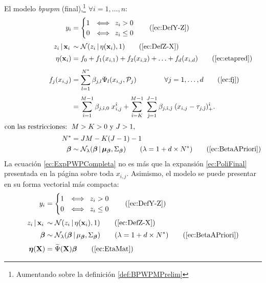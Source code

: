 \documentclass[../Main/Main.tex]{subfiles}
\begin{document}
\begin{definition} \label{def:BPWPMFinal}
El modelo \textit{bpwpm} (final),\footnote{Aumentando sobre la definición \ref{def:BPWPMPrelim}} $\forall i = 1,\ldots,n$: 
\begin{align}
y_i &= 
	\begin{cases}
		1 & \Longleftrightarrow \enspace z_i > 0 \\
		0 & \Longleftrightarrow \enspace z_i \leq 0
	\end{cases} \tag{\ref{ec:DefY-Z}} \\[2pt]
z_i \,|\, \xni\, &\sim \mathcal{N}(z_i\,|\,\eta(\xni),1) 
	\tag{\ref{ec:DefZ-X}} \\[2pt]
\eta(\xni) &= f_0 + f_1(x_{i,1}) + f_2(x_{i,2}) + \ldots + f_d(x_{i,d})
	\tag{\ref{ec:etapred}} \\[4pt]
f_j(x_{i,j}) &= \sum_{l = 1}^{\N} \beta_{j,l} \Psi_l(x_{i,j}, \mathcal{P}_j) 
	\qquad\qquad
	\forall j = 1,\ldots,d \tag{\ref{ec:fj}} \\[3pt]
&=	\sum_{\hat{\imath} = 1}^{M - 1} \beta_{j,\hat{\imath},0} \; 
		x_{i,j}^{\hat{\imath}} + 
	\sum_{\hat{\imath} = K}^{M-1} \; 	
	\sum_{\hat{\jmath} = 1}^{J-1}\beta_{j,\hat{\imath},\hat{\jmath}}
		\;(x_{i,j} - \t_{j,\hat{\jmath}})_{+}^{\hat{\imath}}. \label{ec:ExpPWPCompleta}\\[2pt]
	\text{con las restricciones: } \, & M > K > 0 \text{ y } J > 1, \nonumber \\[2pt]
	\N &= JM - K(J-1) - 1 \\
	\betabf &\sim \mathcal{N}_{\lambda}(\betabf\,|\,\bm{\mu}_{\betabf}, \Sigma_{\betabf}) \qquad(\lambda = 1 + d\times\N) \tag{\ref{ec:BetaAPriori}} 
\end{align}
La ecuación \eqref{ec:ExpPWPCompleta} no es más que la expansión \eqref{ec:PoliFinal} presentada en la página \pageref{ec:PoliFinal} sobre toda $x_{i,j}$. Asimismo, el modelo se puede presentar en su forma vectorial más compacta:
\begin{align}
y_i &= 
	\begin{cases}
		1 & \Longleftrightarrow \enspace z_i > 0 \\
		0 & \Longleftrightarrow \enspace z_i \leq 0
	\end{cases} \tag{\ref{ec:DefY-Z}} \\[2pt]
z_i \,|\, \xni\, &\sim \mathcal{N}(z_i\,|\,\eta(\xni),1) 
	\tag{\ref{ec:DefZ-X}} \\[2pt]
		\betabf &\sim \mathcal{N}_{\lambda}(\betabf\,|\,\mu_{\betabf}, \Sigma_{\betabf}) \qquad(\lambda = 1 + d\times\N) \tag{\ref{ec:BetaAPriori}} \\[2pt]
\bm{\eta}(\xmat) &= \widetilde{\Psi}(\xmat)\betabf \tag{\ref{ec:EtaMat}}
\end{align}
\end{definition}
\end{document}
